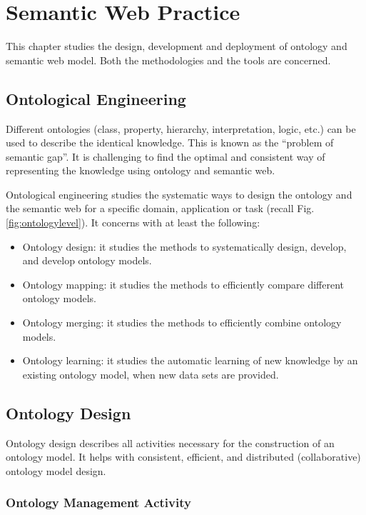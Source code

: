 \chapter{Semantic Web Practice} \label{ch:semanticwebpractice}

This chapter studies the design, development and deployment of ontology and semantic web model. Both the methodologies and the tools are concerned.

\section{Ontological Engineering}

Different ontologies (class, property, hierarchy, interpretation, logic, etc.) can be used to describe the identical knowledge. This is known as the ``problem of semantic gap''. It is challenging to find the optimal and consistent way of representing the knowledge using ontology and semantic web.

Ontological engineering studies the systematic ways to design the ontology and the semantic web for a specific domain, application or task (recall Fig. \ref{fig:ontologylevel}). It concerns with at least the following:
\begin{itemize}
	\item Ontology design: it studies the methods to systematically design, develop, and develop ontology models.
	\item Ontology mapping: it studies the methods to efficiently compare different ontology models.
	\item Ontology merging: it studies the methods to efficiently combine ontology models.
	\item Ontology learning: it studies the automatic learning of new knowledge by an existing ontology model, when new data sets are provided.
\end{itemize}

\section{Ontology Design}

Ontology design describes all activities necessary for the construction of an ontology model. It helps with consistent, efficient, and distributed (collaborative) ontology model design.

\subsection{Ontology Management Activity}

